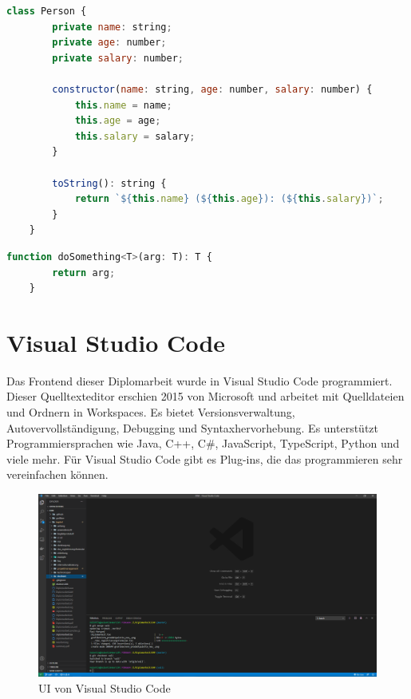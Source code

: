 \begin{lstlisting}[caption={TypeScript-Beispiel Klasse},captionpos=b, language=JavaScript]
	class Person {
		private name: string;
		private age: number;
		private salary: number;
		
		constructor(name: string, age: number, salary: number) {
			this.name = name;
			this.age = age;
			this.salary = salary;
		}
		
		toString(): string {
			return `${this.name} (${this.age}): (${this.salary})`;
		}
	}
\end{lstlisting}
\begin{lstlisting}[caption={TypeScript-Beispiel Generische Programmierung}, language=JavaScript]
	function doSomething<T>(arg: T): T {
		return arg;
	}
\end{lstlisting}

\section{Visual Studio Code}
Das Frontend dieser Diplomarbeit wurde in Visual Studio Code programmiert. Dieser Quelltexteditor erschien 2015 von Microsoft und arbeitet mit Quelldateien und Ordnern in Workspaces. Es bietet Versionsverwaltung, Autovervollständigung, Debugging und Syntaxhervorhebung. Es unterstützt Programmiersprachen wie Java, C++, C\#, JavaScript, TypeScript, Python und viele mehr. Für Visual Studio Code gibt es Plug-ins, die das programmieren sehr vereinfachen können. \autocite{wikiVisualStudioCode}

\begin{figure}[H]
	\centerline{
		\includegraphics[width=1\textwidth, frame]{./grafiken/vs_code_startbildschirm.PNG}
	}
	\vskip0pt
	\caption{UI von Visual Studio Code} \label{fig:visualStudioCodeStartview}
\end{figure}

